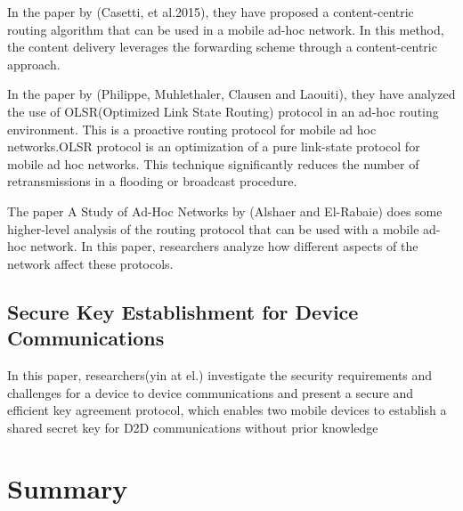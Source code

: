 
\vspace{12pt}
In the paper by (Casetti, et al.2015)\cite{content_centric}, they have proposed a content-centric routing algorithm that can be used in a mobile ad-hoc network. In this method, the content delivery leverages the forwarding scheme through a content-centric approach.

\vspace{12pt}
In the paper by (Philippe, Muhlethaler, Clausen and Laouiti)\cite{olsr}, they have analyzed the use of OLSR(Optimized Link State Routing) protocol in an ad-hoc routing environment. This is a proactive routing protocol for mobile ad hoc networks.OLSR protocol is an optimization of a pure link-state protocol for mobile ad hoc networks. This technique significantly reduces the number of retransmissions in a flooding or broadcast procedure.

\vspace{12pt}

The paper A Study of Ad-Hoc Networks by (Alshaer and El-Rabaie)\cite{adhoc_survay} does some higher-level analysis of the routing protocol that can be used with a mobile ad-hoc network. In this paper, researchers analyze how different aspects of the network affect these protocols.

\vspace{12pt}

\subsection{Secure Key Establishment for Device Communications }


\vspace{12pt}
In this paper, researchers(yin at el.)\cite{Security} investigate the security requirements and challenges for a device to device communications and present a secure and efficient key agreement protocol, which enables two mobile devices to establish a shared secret key for D2D communications without prior knowledge

\vspace{12pt}





\section{Summary }

